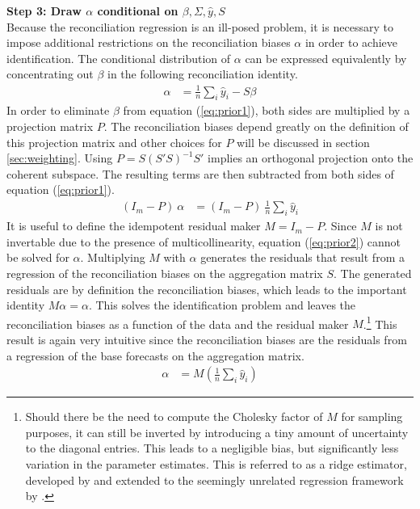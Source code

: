 \documentclass[a4paper,fleqn,11pt]{article}
\begin{document}
\noindent\textbf{Step 3: Draw $\alpha$ conditional on $\beta,\Sigma,\hat{y},S$}\\
Because the reconciliation regression is an ill-posed problem, it is necessary to impose additional restrictions on the reconciliation biases $\alpha$ in order to achieve identification. The conditional distribution of $\alpha$ can be expressed equivalently by concentrating out $\beta$ in the following reconciliation identity.
\begin{align}
	\label{eq:prior1}
	\alpha &= \frac{1}{n}\sum_i \hat{y}_i - S\beta
\end{align}
In order to eliminate $\beta$ from equation (\ref{eq:prior1}), both sides are multiplied by a projection matrix $P$. The reconciliation biases depend greatly on the definition of this projection matrix and other choices for $P$ will be discussed in section \ref{sec:weighting}. Using $P = S(S'S)^{-1}S'$ implies an orthogonal projection onto the coherent subspace. The resulting terms are then subtracted from both sides of equation (\ref{eq:prior1}).
\begin{align}
	\label{eq:prior2}
	(I_m - P)\ \alpha &= (I_m - P)\ \frac{1}{n}\sum_i \hat{y}_i  
\end{align}
It is useful to define the idempotent residual maker $M = I_m - P$. Since $M$ is not invertable due to the presence of multicollinearity, equation (\ref{eq:prior2}) cannot be solved for $\alpha$. Multiplying $M$ with $\alpha$ generates the residuals that result from a regression of the reconciliation biases on the aggregation matrix $S$. The generated residuals are by definition the reconciliation biases, which leads to the important identity $M\alpha = \alpha$. This solves the identification problem and leaves the reconciliation biases as a function of the data and the residual maker $M$.\footnote{Should there be the need to compute the Cholesky factor of $M$ for sampling purposes, it can still be inverted by introducing a tiny amount of uncertainty to the diagonal entries. This leads to a negligible bias, but significantly less variation in the parameter estimates. This is referred to as a ridge estimator, developed by \cite{Brown1980} and extended to the seemingly unrelated regression framework by \cite{Haitovsky1987}.} This result is again very intuitive since the reconciliation biases are the residuals from a regression of the base forecasts on the aggregation matrix.
\begin{align}
\alpha &= M\left(\frac{1}{n}\sum_i \hat{y}_i\right)
\end{align}
\end{document}
